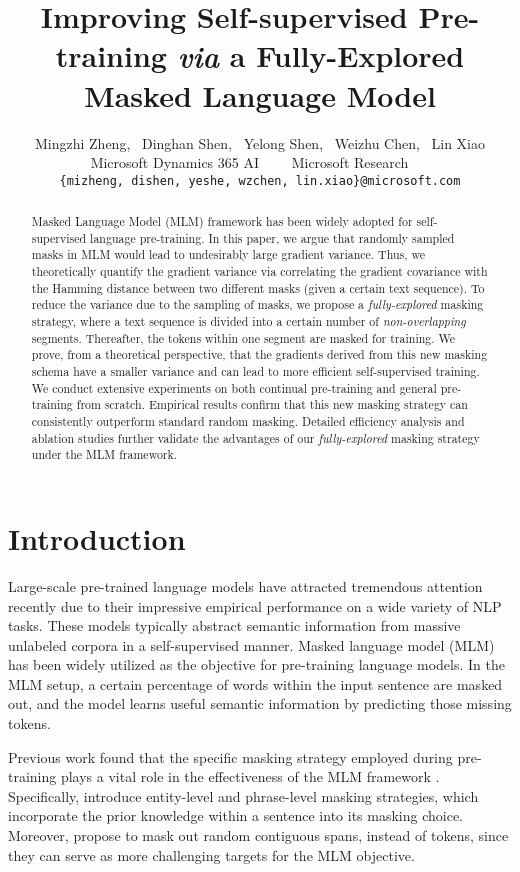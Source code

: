 \documentclass{article} \usepackage{iclr2021_conference,times}
\title{Improving Self-supervised Pre-training \emph{via} a Fully-Explored Masked Language Model}
\author{Mingzhi Zheng, ~Dinghan Shen, ~Yelong Shen, ~Weizhu Chen, ~Lin Xiao \\
 Microsoft Dynamics 365 AI~~~~
	 Microsoft Research~~~ \\
{\tt \{mizheng, dishen, yeshe, wzchen, lin.xiao\}@microsoft.com} \\
}
\theoremstyle{plain}
\begin{document}
\maketitle
\begin{abstract}
Masked Language Model (MLM) framework has been widely adopted for self-supervised language pre-training.  
In this paper, we argue that randomly sampled masks in MLM would lead to undesirably large gradient variance.
Thus, we theoretically quantify the gradient variance via correlating the gradient covariance with the Hamming distance between two different masks (given a certain text sequence).
To reduce the variance due to the sampling of masks, we propose a \emph{fully-explored} masking strategy, where a text sequence is divided into a certain number of \emph{non-overlapping} segments. 
Thereafter, the tokens within one segment are masked for training. 
We prove, from a theoretical perspective, that the gradients derived from this new masking schema have a smaller variance and can lead to more efficient self-supervised training. We conduct extensive experiments on both continual pre-training and general pre-training from scratch. Empirical results 
confirm that this new masking strategy can consistently outperform standard random masking.
Detailed efficiency analysis and ablation studies further validate the advantages of our \emph{fully-explored} masking strategy under the MLM framework.
\end{abstract}
\vspace{-2mm}
\section{Introduction} 
\vspace{-2mm}
Large-scale pre-trained language models have attracted tremendous attention recently due to their impressive empirical performance on a wide variety of NLP tasks.
These models typically abstract semantic information from massive unlabeled corpora in a self-supervised manner. Masked language model (MLM) has been widely utilized as the objective for pre-training language models. In the MLM setup, a certain percentage of words within the input sentence are masked out, and the model learns useful semantic information by predicting those missing tokens. 

Previous work found that the specific masking strategy employed during pre-training plays a vital role in the effectiveness of the MLM framework \citep{liu2019roberta, joshi2019spanbert, sun2019ernie}. 
Specifically, \citet{sun2019ernie} introduce entity-level and phrase-level masking strategies, which incorporate the prior knowledge within a sentence into its masking choice. 
Moreover, \citet{joshi2019spanbert} propose to mask out random contiguous spans, instead of tokens, since they can serve as more challenging targets for the MLM objective. 
\end{document}
